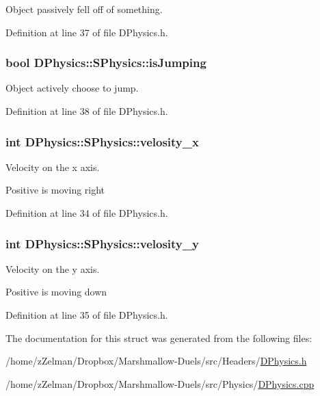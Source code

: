 Object passively fell off of something. 



Definition at line 37 of file D\-Physics.\-h.

\hypertarget{structDPhysics_1_1SPhysics_a6fc3e1a46d84fb6dec9f198bb6513856}{
\subsubsection[{is\-Jumping}]{\setlength{\rightskip}{0pt plus 5cm}bool D\-Physics\-::\-S\-Physics\-::is\-Jumping}}\label{structDPhysics_1_1SPhysics_a6fc3e1a46d84fb6dec9f198bb6513856}


Object actively choose to jump. 



Definition at line 38 of file D\-Physics.\-h.

\hypertarget{structDPhysics_1_1SPhysics_a2654e1fd65ea35fe4119c7866fd46274}{
\subsubsection[{velosity\-\_\-x}]{\setlength{\rightskip}{0pt plus 5cm}int D\-Physics\-::\-S\-Physics\-::velosity\-\_\-x}}\label{structDPhysics_1_1SPhysics_a2654e1fd65ea35fe4119c7866fd46274}


Velocity on the x axis. 

Positive is moving right 

Definition at line 34 of file D\-Physics.\-h.

\hypertarget{structDPhysics_1_1SPhysics_a58c1f8fa61d0aeece450d7ab789c5013}{
\subsubsection[{velosity\-\_\-y}]{\setlength{\rightskip}{0pt plus 5cm}int D\-Physics\-::\-S\-Physics\-::velosity\-\_\-y}}\label{structDPhysics_1_1SPhysics_a58c1f8fa61d0aeece450d7ab789c5013}


Velocity on the y axis. 

Positive is moving down 

Definition at line 35 of file D\-Physics.\-h.



The documentation for this struct was generated from the following files\-:\begin{DoxyCompactItemize}
\item 
/home/z\-Zelman/\-Dropbox/\-Marshmallow-\/\-Duels/src/\-Headers/\hyperlink{DPhysics_8h}{D\-Physics.\-h}\item 
/home/z\-Zelman/\-Dropbox/\-Marshmallow-\/\-Duels/src/\-Physics/\hyperlink{DPhysics_8cpp}{D\-Physics.\-cpp}\end{DoxyCompactItemize}
